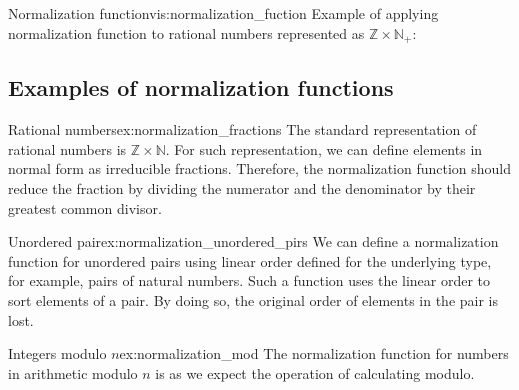 \begin{vis}[B]{Normalization function}{vis:normalization_fuction}
Example of applying normalization function to rational numbers represented as $\mathbb{Z} \times \mathbb{N_+}$:
\begin{center}
\end{center}
\end{vis}

\subsection{Examples of normalization functions}
\begin{example}{Rational numbers}{ex:normalization_fractions}
The standard representation of rational numbers is $\mathbb{Z} \times \mathbb{N}$. For such representation, we can define elements in normal form as irreducible fractions. Therefore, the normalization function should reduce the fraction by dividing the numerator and the denominator by their greatest common divisor.
\end{example}
\begin{example}{Unordered pair}{ex:normalization_unordered_pirs}
We can define a normalization function for unordered pairs using linear order defined for the underlying type, for example, pairs of natural numbers. Such a function uses the linear order to sort elements of a pair. By doing so, the original order of elements in the pair is lost.
\end{example}
\begin{example}{Integers modulo $n$}{ex:normalization_mod}
The normalization function for numbers in arithmetic modulo $n$ is as we expect the operation of calculating modulo.
\end{example}

